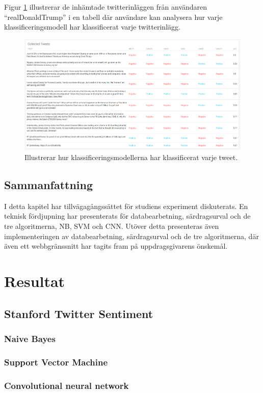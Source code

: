 \documentclass{kaumasters} %
\begin{document}
Figur \ref{fig:gui_search_t} illustrerar de inhämtade twitterinläggen från användaren “realDonaldTrump” i en tabell där användare kan analysera hur varje klassificeringsmodell har klassificerat varje twitterinlägg.

\begin{figure}[H]
\includegraphics[width=12cm]{GUI_search_table}
\centering
\caption{Illustrerar hur klassificeringsmodellerna har klassificerat varje tweet.}
\label{fig:gui_search_t}
\end{figure}
\section{Sammanfattning}
I detta kapitel har tillvägagångssättet för studiens experiment diskuterats. En teknisk fördjupning har presenterats för databearbetning, särdragsurval och de tre algoritmerna, NB, SVM och CNN. Utöver detta presenteras även implementeringen av databearbetning, särdragsurval och de tre algoritmerna, där även ett webbgränssnitt har tagits fram på uppdragsgivarens önskemål.

\chapter{Resultat} \label{res}

\section{Stanford Twitter Sentiment}
\subsection{Naive Bayes}
\subsection{Support Vector Machine}
\subsection{Convolutional neural network}
\end{document}
